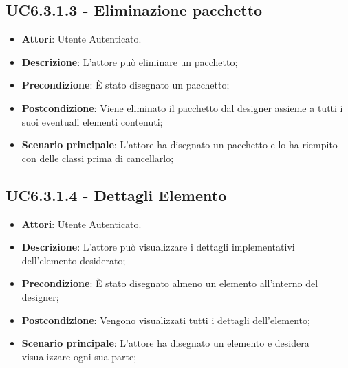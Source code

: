 \subsection{UC6.3.1.3 - Eliminazione pacchetto} 
\label{ssec:UC6.3.1.3} 
\begin{itemize} 
\item \textbf{Attori}: Utente Autenticato.
\item \textbf{Descrizione}: L'attore può eliminare un pacchetto;
\item \textbf{Precondizione}: È stato disegnato un pacchetto;
\item \textbf{Postcondizione}: Viene eliminato il pacchetto dal designer assieme a tutti i suoi eventuali elementi contenuti;
\item \textbf{Scenario principale}: L'attore ha disegnato un pacchetto e lo ha riempito con delle classi prima di cancellarlo;\end{itemize} 
\subsection{UC6.3.1.4 - Dettagli Elemento} 
\label{ssec:UC6.3.1.4} 
\begin{itemize} 
\item \textbf{Attori}: Utente Autenticato.
\item \textbf{Descrizione}: L'attore può visualizzare i dettagli implementativi dell'elemento desiderato;
\item \textbf{Precondizione}: È stato disegnato almeno un elemento all'interno del designer;
\item \textbf{Postcondizione}: Vengono visualizzati tutti i dettagli dell'elemento;
\item \textbf{Scenario principale}: L'attore ha disegnato un elemento e desidera visualizzare ogni sua parte;\end{itemize} 
